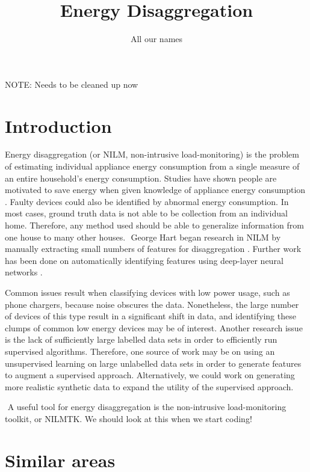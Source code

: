 \documentclass{article}
\title{Energy Disaggregation}
\author{All our names}
\date{}
\begin{document}
\maketitle


NOTE: Needs to be cleaned up now

\section{Introduction}


Energy disaggregation (or NILM, non-intrusive load-monitoring) is the problem of estimating individual appliance energy consumption from a single measure of an entire household's energy consumption. Studies have shown people are motivated to save energy when given knowledge of appliance energy consumption \cite{Darby}. Faulty devices could also be identified by abnormal energy consumption. In most cases, ground truth data is not able to be collection from an individual home. Therefore, any method used should be able to generalize information from one house to many other houses.
​
George Hart began research in NILM by manually extracting small numbers of features for disaggregation \cite{Hart2, Hart1}. Further work has been done on automatically identifying features using deep-layer neural networks \cite{ Kelly}.

Common issues result when classifying devices with low power usage, such as phone chargers, because noise obscures the data. Nonetheless, the large number of devices of this type result in a significant shift in data, and identifying these clumps of common low energy devices may be of interest. Another research issue is the lack of sufficiently large labelled data sets in order to efficiently run supervised algorithms. Therefore, one source of work may be on using an unsupervised learning on large unlabelled data sets in order to generate features to augment a supervised approach. Alternatively, we could work on generating more realistic synthetic data to expand the utility of the supervised approach.

​
A useful tool for energy disaggregation is the non-intrusive load-monitoring toolkit, or NILMTK. We should look at this when we start coding!



\section{Similar areas}
\end{document}
